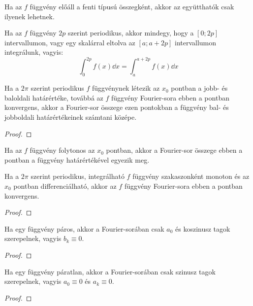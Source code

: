 \begin{note}
  Ha az $f$ függvény előáll a fenti típusú összegként, akkor az együtthatók
  csak ilyenek lehetnek.
\end{note}

\begin{note}
  Ha az $f$ függvény $2p$ szerint periodikus, akkor mindegy, hogy a $[0; 2p]$
  intervallumon, vagy egy skalárral eltolva az $[a; a+2p]$ intervallumon
  integrálunk, vagyis:
  $$
    \int_0^{2p} f(x) \dd x = \int_a^{a+2p} f(x) \dd x
  $$
\end{note}

\begin{theorem}
  Ha a $2\pi$ szerint periodikus $f$ függvénynek létezik az $x_0$ pontban a
  jobb- és baloldali határértéke, továbbá az $f$ függvény Fourier-sora ebben a
  pontban konvergens, akkor a Fourier-sor összege ezen pontokban a függvény
  bal- és jobboldali határértékeinek számtani középe.

  \begin{proof}
    \vspace{8em}
  \end{proof}
\end{theorem}

\begin{note}
  Ha az $f$ függvény folytonos az $x_0$ pontban, akkor a Fourier-sor összege
  ebben a pontban a függvény határértékével egyezik meg.
\end{note}

\begin{theorem}
  Ha a $2\pi$ szerint periodikus, integrálható $f$ függvény szakaszonként
  monoton és az $x_0$ pontban differenciálható, akkor az $f$ függvény
  Fourier-sora ebben a pontban konvergens.

  \begin{proof}
    \vspace{8em}
  \end{proof}
\end{theorem}

\begin{statement}
  Ha egy függvény páros, akkor a Fourier-sorában csak $a_0$ és koszinusz tagok
  szerepelnek, vagyis $b_k \equiv 0$.

  \begin{proof}
    \vspace{8em}
  \end{proof}
\end{statement}

\begin{statement}
  Ha egy függvény páratlan, akkor a Fourier-sorában csak szinusz tagok
  szerepelnek, vagyis $a_0 \equiv 0$ és $a_k \equiv 0$.

  \begin{proof}
    \vspace{8em}
  \end{proof}
\end{statement}

